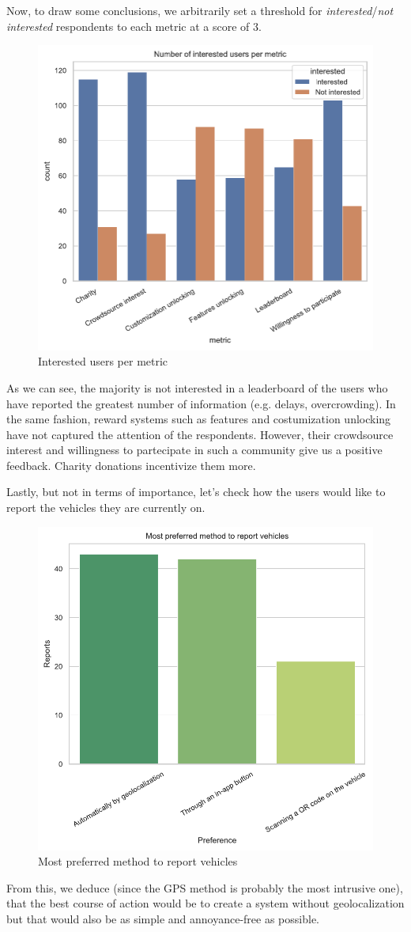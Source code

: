 \documentclass[a4paper, 11pt]{report}
\begin{document}
Now, to draw some conclusions, we arbitrarily set a threshold for \emph{interested}/\emph{not interested} respondents to each metric at a score of $3$. 
\begin{figure}[H]
	\centering
	\includegraphics[width=.5\textwidth]{img/analysis/interested_users_per_metric.pdf}
	\caption{Interested users per metric}
\end{figure}
As we can see, the majority is not interested in a leaderboard of the users who have reported the greatest number of 
information (e.g. delays, overcrowding). In the same fashion, reward systems such as features and costumization unlocking have not captured the attention of the 
respondents. However, their crowdsource interest and willingness to partecipate in such a community give us a positive feedback. 
Charity donations incentivize them more.

Lastly, but not in terms of importance, let's check how the users would like to report the vehicles they are currently on.
\begin{figure}[H]
	\centering
	\includegraphics[width=.5\textwidth]{img/analysis/most_preferred_method_to_report.pdf}
	\caption{Most preferred method to report vehicles}
\end{figure}
From this, we deduce (since the GPS method is probably the most intrusive one), that the best course of action would be to create a system without geolocalization but that would also be as simple and annoyance-free as possible.
\end{document}
